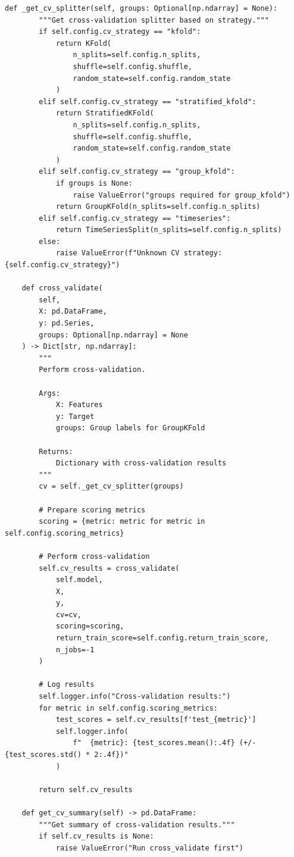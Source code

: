 \begin{lstlisting}[style=python, caption={Production Model Validation Framework}]
    def _get_cv_splitter(self, groups: Optional[np.ndarray] = None):
        """Get cross-validation splitter based on strategy."""
        if self.config.cv_strategy == "kfold":
            return KFold(
                n_splits=self.config.n_splits,
                shuffle=self.config.shuffle,
                random_state=self.config.random_state
            )
        elif self.config.cv_strategy == "stratified_kfold":
            return StratifiedKFold(
                n_splits=self.config.n_splits,
                shuffle=self.config.shuffle,
                random_state=self.config.random_state
            )
        elif self.config.cv_strategy == "group_kfold":
            if groups is None:
                raise ValueError("groups required for group_kfold")
            return GroupKFold(n_splits=self.config.n_splits)
        elif self.config.cv_strategy == "timeseries":
            return TimeSeriesSplit(n_splits=self.config.n_splits)
        else:
            raise ValueError(f"Unknown CV strategy: {self.config.cv_strategy}")

    def cross_validate(
        self,
        X: pd.DataFrame,
        y: pd.Series,
        groups: Optional[np.ndarray] = None
    ) -> Dict[str, np.ndarray]:
        """
        Perform cross-validation.

        Args:
            X: Features
            y: Target
            groups: Group labels for GroupKFold

        Returns:
            Dictionary with cross-validation results
        """
        cv = self._get_cv_splitter(groups)

        # Prepare scoring metrics
        scoring = {metric: metric for metric in self.config.scoring_metrics}

        # Perform cross-validation
        self.cv_results = cross_validate(
            self.model,
            X,
            y,
            cv=cv,
            scoring=scoring,
            return_train_score=self.config.return_train_score,
            n_jobs=-1
        )

        # Log results
        self.logger.info("Cross-validation results:")
        for metric in self.config.scoring_metrics:
            test_scores = self.cv_results[f'test_{metric}']
            self.logger.info(
                f"  {metric}: {test_scores.mean():.4f} (+/- {test_scores.std() * 2:.4f})"
            )

        return self.cv_results

    def get_cv_summary(self) -> pd.DataFrame:
        """Get summary of cross-validation results."""
        if self.cv_results is None:
            raise ValueError("Run cross_validate first")


\end{lstlisting}
